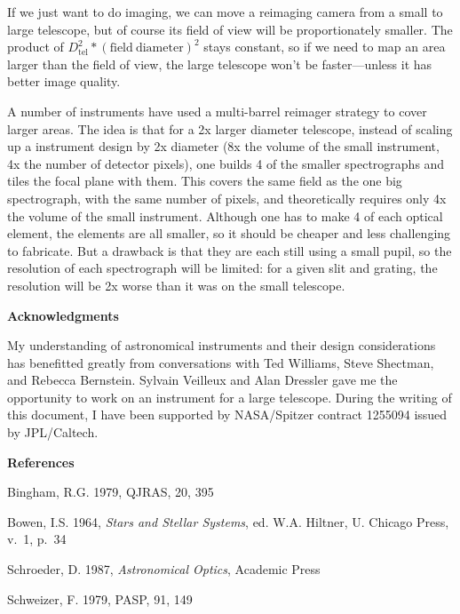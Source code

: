 \documentclass[12pt]{article}
\begin{document}
If we just want to do imaging, we can move a reimaging camera
from a small to large telescope, but of course its field of
view will be proportionately smaller.  The product of 
$D_{\mathrm{tel}}^2 * (\mathrm{field\ diameter})^2$ stays constant, so if we need to
map an area larger than the field of view, the large telescope won't be
faster---unless it has better image quality.

A number of instruments have used a multi-barrel reimager
strategy to cover larger areas.  The idea is that for a 2x larger
diameter
telescope, instead of scaling up a instrument design by 2x diameter
(8x the volume of the small instrument, 4x the number of detector
pixels), one builds 4 of the 
smaller spectrographs and tiles the focal plane with them.  This 
covers the same field as the one big spectrograph, with the same
number of pixels, and theoretically
requires only 4x the volume of the small instrument.  Although one 
has to make 4 of each optical element, the elements are all smaller, 
so it should be cheaper and less challenging to fabricate.  But a 
drawback is that they are each still
using a small pupil, so the resolution of each spectrograph 
will be limited: for a given slit and grating, the resolution will
be 2x worse than it was on the small telescope.



\vspace{1 in}

\bigskip


{\bf Acknowledgments}

My understanding of astronomical instruments and their design
considerations has benefitted greatly from conversations with
Ted Williams, Steve Shectman, and Rebecca Bernstein.
Sylvain Veilleux and Alan Dressler gave me the opportunity to
work on an instrument for a large telescope.  During the
writing of this document, I have been supported by 
NASA/Spitzer contract 1255094 issued by JPL/Caltech.

\bigskip

{\bf References}

Bingham, R.G. 1979, QJRAS, 20, 395

Bowen, I.S. 1964, {\it Stars and Stellar Systems}, ed. W.A. Hiltner,
U. Chicago Press, v.\ 1, p.\ 34

Schroeder, D. 1987, {\it Astronomical Optics}, Academic Press

Schweizer, F. 1979, PASP, 91, 149
\end{document}

